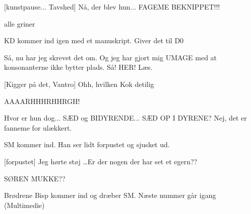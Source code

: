 \documentclass[a4paper,11pt]{article}
\begin{document}
\begin{sketch}
  [kunstpause... Tavshed] Nå, der blev hun... FAGEME
  BEKNIPPET!!!
  
  \scene alle griner
  
  \scene KD kommer ind igen med et manuskript. Giver det til D0
  
   Så, nu har jeg skrevet det om. Og jeg har gjort mig UMAGE
  med at konsonanterne ikke bytter plads. Så! HER! Læs.
  
  [Kigger på det, Vantro] Ohh, hvilken Kok detilig
  
   AAAARHHHRHHRGH!
  
   Hvor er hun dog... SÆD og BIDYRENDE... SÆD OP I DYRENE?
  Nej, det er fanneme for ulækkert.

  \scene SM kommer ind. Han ser lidt forpustet og sjusket ud.
  
  [forpustet] Jeg hørte støj \ldots Er der nogen der har set
  et egern??

   SØREN MUKKE??
  
  \scene Brødrene Bisp kommer ind og dræber SM. Næste nummer går igang
  (Multimedie)

\end{sketch}
\end{document}
